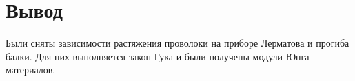 \section{Вывод}
Были сняты зависимости растяжения проволоки на приборе Лерматова и прогиба балки.
Для них выполняется закон Гука и были получены модули Юнга материалов.